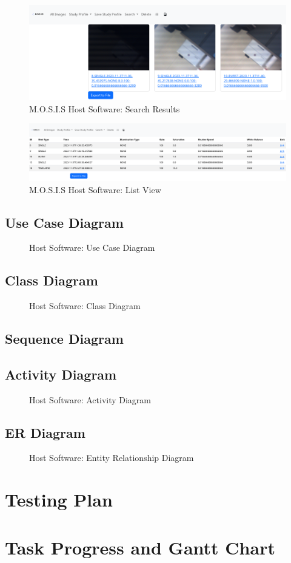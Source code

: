 \documentclass[12pt]{article}
\begin{document}
\begin{figure}[H]
	\includegraphics[width=\textwidth]{Figures/search_results.png}
	\caption{M.O.S.I.S Host Software: Search Results}
\end{figure}
\begin{figure}[H]
	\includegraphics[width=\textwidth]{Figures/list_view.png}
	\caption{M.O.S.I.S Host Software: List View}
\end{figure}
\subsection{Use Case Diagram}
\begin{figure}[H]
	\caption{Host Software: Use Case Diagram}
\end{figure}
\subsection{Class Diagram}
\begin{figure}[H]
	\caption{Host Software: Class Diagram}
\end{figure}
\subsection{Sequence Diagram}
\subsection{Activity Diagram}
\begin{figure}[H]
	\caption{Host Software: Activity Diagram}
\end{figure}
\subsection{ER Diagram}
\begin{figure}[H]
	\caption{Host Software: Entity Relationship Diagram}
\end{figure}
\section{Testing Plan}
\section{Task Progress and Gantt Chart}
\end{document}
